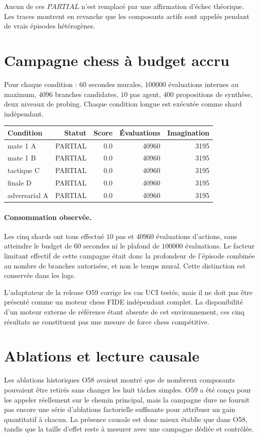 \documentclass[11pt,a4paper]{article}
\begin{document}
Aucun de ces $PARTIAL$ n'est remplacé par une affirmation d'échec théorique. Les traces montrent en revanche que les composants actifs sont appelés pendant de vrais épisodes hétérogènes.

\section{Campagne chess à budget accru}
Pour chaque condition : $60$ secondes murales, $100000$ évaluations internes au maximum, $4096$ branches candidates, $10$ pas agent, $400$ propositions de synthèse, deux niveaux de probing. Chaque condition longue est exécutée comme shard indépendant.

\begin{center}
\scriptsize
\begin{tabular}{lrrrr}
\toprule
Condition & Statut & Score & Évaluations & Imagination\\
\midrule
mate 1 A & PARTIAL & 0.0 & 40960 & 3195\\
mate 1 B & PARTIAL & 0.0 & 40960 & 3195\\
tactique C & PARTIAL & 0.0 & 40960 & 3195\\
finale D & PARTIAL & 0.0 & 40960 & 3195\\
adversarial A & PARTIAL & 0.0 & 40960 & 3195\\
\bottomrule
\end{tabular}
\end{center}

\paragraph{Consommation observée.} Les cinq shards ont tous effectué $10$ pas et $40960$ évaluations d’actions, sans atteindre le budget de $60$ secondes ni le plafond de $100000$ évaluations. Le facteur limitant effectif de cette campagne était donc la profondeur de l’épisode combinée au nombre de branches autorisées, et non le temps mural. Cette distinction est conservée dans les logs.

L'adaptateur de la release O59 corrige les cas UCI testés, mais il ne doit pas être présenté comme un moteur chess FIDE indépendant complet. La disponibilité d'un moteur externe de référence étant absente de cet environnement, ces cinq résultats ne constituent pas une mesure de force chess compétitive.

\section{Ablations et lecture causale}
Les ablations historiques O58 avaient montré que de nombreux composants pouvaient être retirés sans changer les huit tâches simples. O59 a été conçu pour les appeler réellement sur le chemin principal, mais la campagne dure ne fournit pas encore une série d'ablations factorielle suffisante pour attribuer un gain quantitatif à chacun. La présence causale est donc mieux établie que dans O58, tandis que la taille d'effet reste à mesurer avec une campagne dédiée et contrôlée.
\end{document}
